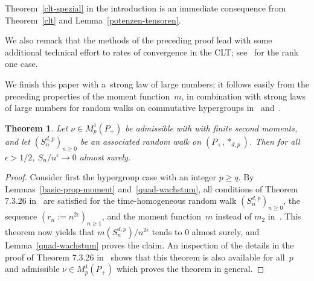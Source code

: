 \documentclass[pdftex]{sigma}
\numberwithin{equation}{section}
\newtheorem{Theorem}{Theorem}[section]
\begin{document}
Theorem~\ref{clt-spezial} in the introduction is an immediate consequence from Theorem~\ref{clt} and
Lem\-ma~\ref{potenzen-tensoren}.

We also remark that the methods of the preceding proof lead with some additional technical ef\/fort to rates of
convergence in the CLT; see~\cite{Ga,V1} for the rank one case.

We f\/inish this paper with a~strong law of large numbers; it follows easily from the preceding properties of the moment
function~$m$, in combination with strong laws of large numbers for random walks on commutative hypergroups in~\cite[Section~7.3]{BH} and~\cite{Z}.

\begin{Theorem}
Let $\nu\in M^1_p(P_+)$ be admissible with with finite second moments, and let $(S_n^{d,p})_{n\ge0}$ be an associated
random walk on $(P_+,*_{d,p})$.
Then for all $\epsilon>1/2$, $S_n/n^\epsilon\to0$ almost surely.
\end{Theorem}

\begin{proof}
Consider f\/irst the hypergroup case with an integer $p\ge q$.
By Lemmas~\ref{basic-prop-moment} and~\ref{quad-wachstum}, all conditions of Theorem 7.3.26 in~\cite{BH} are satisf\/ied
for the time-homogeneous random walk $(S_n^{d,p})_{n\ge0}$, the sequence $(r_n:= n^{2\epsilon})_{n\ge1}$, and the moment
function~$m$ instead of $m_2$ in~\cite{BH}.
This theorem now yields that $m(S_n^{d,p})/ n^{2\epsilon}$ tends to $0$ almost surely, and Lemma~\ref{quad-wachstum}
proves the claim.
An inspection of the details in the proof of Theorem 7.3.26 in~\cite{BH} shows that this theorem is also available for
all~$p$ and admissible $\nu\in M^1_p(P_+)$ which proves the theorem in general.
\end{proof}

\vspace{-4mm}
\end{document}

